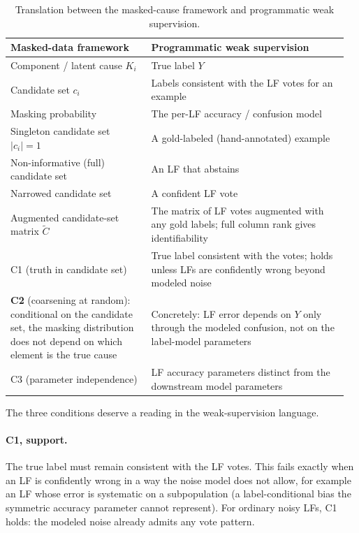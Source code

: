 \begin{table}[ht]
\centering
\small
\begin{tabular}{@{}p{0.40\linewidth} p{0.56\linewidth}@{}}
\toprule
\textbf{Masked-data framework} & \textbf{Programmatic weak supervision} \\
\midrule
Component / latent cause $K_i$ & True label $Y$ \\
Candidate set $c_i$ & Labels consistent with the LF votes for an example \\
Masking probability & The per-LF accuracy / confusion model \\
Singleton candidate set $|c_i|=1$ & A gold-labeled (hand-annotated) example \\
Non-informative (full) candidate set & An LF that abstains \\
Narrowed candidate set & A confident LF vote \\
Augmented candidate-set matrix $\tilde C$ & The matrix of LF votes
  augmented with any gold labels; full column rank gives
  identifiability \\
C1 (truth in candidate set) & True label consistent with the votes;
  holds unless LFs are confidently wrong beyond modeled noise \\
\textbf{C2} (coarsening at random): conditional on the candidate set, the masking distribution does not depend on which element is the true cause &
  Concretely: LF error depends on $Y$ only through the modeled
  confusion, not on the label-model parameters \\
C3 (parameter independence) & LF accuracy parameters distinct from
  the downstream model parameters \\
\bottomrule
\end{tabular}
\caption{Translation between the masked-cause framework
\citep{towell2026masked} and programmatic weak supervision.}
\label{tab:translation}
\end{table}

The three conditions deserve a reading in the weak-supervision
language.

\paragraph{C1, support.} The true label must remain consistent with
the LF votes. This fails exactly when an LF is confidently wrong in a
way the noise model does not allow, for example an LF whose error is
systematic on a subpopulation (a label-conditional bias the
symmetric accuracy parameter cannot represent). For ordinary noisy
LFs, C1 holds: the modeled noise already admits any vote pattern.

